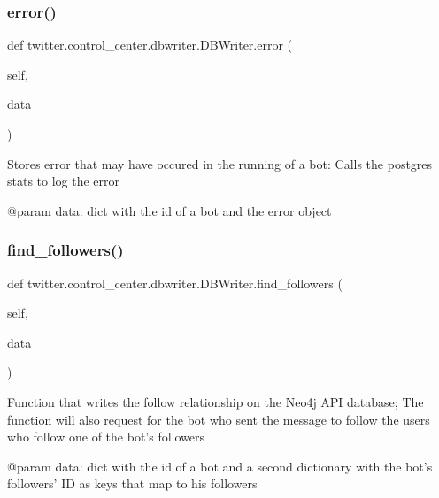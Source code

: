 \subsubsection{\texorpdfstring{error()}{error()}}
{\footnotesize\ttfamily def twitter.\+control\+\_\+center.\+dbwriter.\+D\+B\+Writer.\+error (\begin{DoxyParamCaption}\item[{}]{self,  }\item[{}]{data }\end{DoxyParamCaption})}

\begin{DoxyVerb}Stores error that may have occured in the running of a bot:
Calls the postgres stats to log the error

@param data: dict with the id of a bot and the error object
\end{DoxyVerb}
 \mbox{\label{classtwitter_1_1control__center_1_1dbwriter_1_1DBWriter_a65e268dcff959f29e258113ef6043a76}} 
\subsubsection{\texorpdfstring{find\+\_\+followers()}{find\_followers()}}
{\footnotesize\ttfamily def twitter.\+control\+\_\+center.\+dbwriter.\+D\+B\+Writer.\+find\+\_\+followers (\begin{DoxyParamCaption}\item[{}]{self,  }\item[{}]{data }\end{DoxyParamCaption})}

\begin{DoxyVerb}Function that writes the follow relationship on the Neo4j API database;
The function will also request for the bot who sent the message to follow the users who follow
one of the bot's followers

@param data: dict with the id of a bot and a second dictionary with the bot's followers' ID as keys that map
to his followers
\end{DoxyVerb}
 \mbox{\label{classtwitter_1_1control__center_1_1dbwriter_1_1DBWriter_a59e9de0b9462c07bc173e160c3431e5a}} 
